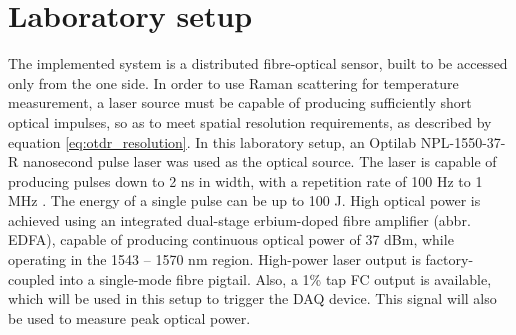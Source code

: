 \documentclass{standalone}
\begin{document}
\chapter{Laboratory setup} \label{ch:setup}
\setcounter{page}\thestranica


The implemented system is a distributed fibre-optical sensor, built to be accessed only from the one side. In order to use Raman scattering for temperature measurement, a laser source must be capable of producing sufficiently short optical impulses, so as to meet spatial resolution requirements, as described by equation \ref{eq:otdr_resolution}. In this laboratory setup, an Optilab NPL-1550-37-R nanosecond pulse laser was used as the optical source. The laser is capable of producing pulses down to 2 ns in width, with a repetition rate of 100 Hz to 1 MHz \cite{datasheet:laser}. The energy of a single pulse can be up to 100 \textmu J. High optical power is achieved using an integrated dual-stage erbium-doped fibre amplifier (abbr. EDFA), capable of producing continuous optical power of 37 dBm, while operating in the 1543 -- 1570 nm region. High-power laser output is factory-coupled into a single-mode fibre pigtail. Also, a 1\% tap FC output is available, which will be used in this setup to trigger the DAQ device. This signal will also be used to measure peak optical power. \\
\end{document}
